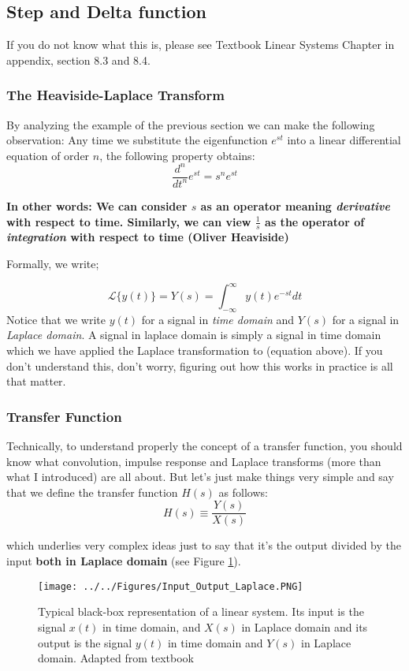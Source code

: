 \subsection{Step and Delta function}

If you do not know what this is, please see Textbook Linear Systems Chapter in appendix, section 8.3 and 8.4.

\subsubsection{The Heaviside-Laplace Transform}

By analyzing the example of the previous section we can make
the following observation: Any time we substitute the eigenfunction $e^{st}$ into a
linear differential equation of order $n$, the following property obtains:
\begin{equation}
    \frac{d^n}{dt^n}e^{st} = s^ne^{st}
\end{equation}

\textbf{In other words: We can consider $s$ as an operator meaning \textit{derivative} with respect to time. Similarly, we can view $\frac{1}{s}$ as the operator of \textit{integration} with respect to time (Oliver Heaviside)}

Formally, we write; 

\begin{equation}
    \mathscr{L}\{y(t)\}=Y(s)= \int_{-\infty}^{\infty} {y(t)e^{-st}} dt
\end{equation}
Notice that we write $y(t)$ for a signal in \textit{time domain} and $Y(s)$ for a signal in \textit{Laplace domain}. A signal in laplace domain is simply a signal in time domain which we have applied the Laplace transformation to (equation above). If you don't understand this, don't worry, figuring out how this works in practice is all that matter.  

\subsubsection{Transfer Function}

Technically, to understand properly the concept of a transfer function, you should know what convolution, impulse response and Laplace transforms (more than what I introduced) are all about. But let's just make things very simple and say that we define the transfer function $H(s)$ as follows: 
\begin{equation}
    H(s) \equiv \frac{Y(s)}{X(s)}
\end{equation}

which underlies very complex ideas just to say that it's the output divided by the input \textbf{both in Laplace domain} (see Figure \ref{fig:Linear_Systems_Laplace}).

\begin{figure}[H]
    \centering
    \texttt{[image: ../../Figures/Input\_Output\_Laplace.PNG]}
    \caption{Typical black-box representation of a linear system. Its input is the signal $x(t)$ in time domain, and $X(s)$ in Laplace domain and its output is the signal $y(t)$ in time domain and $Y(s)$ in Laplace domain. Adapted from textbook}
    \label{fig:Linear_Systems_Laplace}
\end{figure}

